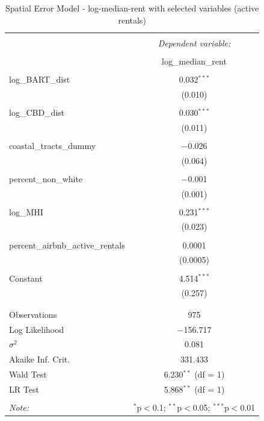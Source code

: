 \documentclass[10pt, letterpaper]{amsart}
\begin{document}
\begin{table}[!htbp] \centering 
  \caption{Spatial Error Model - log-median-rent with selected variables (active rentals)} 
  \label{} 
  \begin{tabular}{@{\extracolsep{5pt}}lc} 
    \\[-1.8ex]\hline 
    \hline \\[-1.8ex] 
    & \multicolumn{1}{c}{\textit{Dependent variable:}} \\ 
    \cline{2-2} 
    \\[-1.8ex] & log\_median\_rent \\ 
    \hline \\[-1.8ex] 
    log\_BART\_dist & 0.032$^{***}$ \\ 
    & (0.010) \\ 
    & \\ 
    log\_CBD\_dist & 0.030$^{***}$ \\ 
    & (0.011) \\ 
    & \\ 
    coastal\_tracts\_dummy & $-$0.026 \\ 
    & (0.064) \\ 
    & \\ 
    percent\_non\_white & $-$0.001 \\ 
    & (0.001) \\ 
    & \\ 
    log\_MHI & 0.231$^{***}$ \\ 
    & (0.023) \\ 
    & \\ 
    percent\_airbnb\_active\_rentals & 0.0001 \\ 
    & (0.0005) \\ 
    & \\ 
    Constant & 4.514$^{***}$ \\ 
    & (0.257) \\ 
    & \\ 
    \hline \\[-1.8ex] 
    Observations & 975 \\ 
    Log Likelihood & $-$156.717 \\ 
    $\sigma^{2}$ & 0.081 \\ 
    Akaike Inf. Crit. & 331.433 \\ 
    Wald Test & 6.230$^{**}$ (df = 1) \\ 
    LR Test & 5.868$^{**}$ (df = 1) \\ 
    \hline 
    \hline \\[-1.8ex] 
    \textit{Note:}  & \multicolumn{1}{r}{$^{*}$p$<$0.1; $^{**}$p$<$0.05; $^{***}$p$<$0.01} \\ 
  \end{tabular} 
\end{table}
\end{document}
